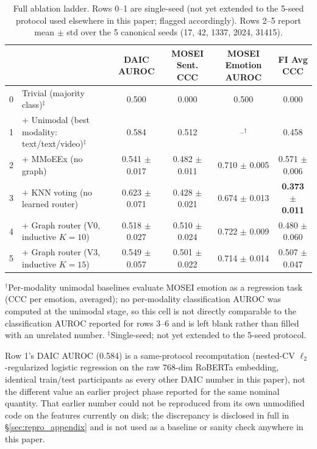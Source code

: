 \documentclass[letterpaper]{article}
\begin{document}
\begin{table}[t]
\centering
\caption{Full ablation ladder. Rows 0--1 are single-seed (not yet extended to the 5-seed protocol used elsewhere in this paper; flagged accordingly). Rows 2--5 report mean $\pm$ std over the 5 canonical seeds (17, 42, 1337, 2024, 31415).}
\label{tab:full_ablation}
\small
\begin{tabular}{llcccc}
\toprule
 & & DAIC AUROC & MOSEI Sent. CCC & MOSEI Emotion AUROC & FI Avg CCC \\
\midrule
0 & Trivial (majority class)$^\ddagger$ & 0.500 & 0.000 & 0.500 & 0.000 \\
1 & + Unimodal (best modality: text/text/video)$^\ddagger$ & 0.584 & 0.512 & --$^\dagger$ & 0.458 \\
2 & + MMoEEx (no graph) & 0.541 $\pm$ 0.017 & 0.482 $\pm$ 0.011 & 0.710 $\pm$ 0.005 & 0.571 $\pm$ 0.006 \\
3 & + KNN voting (no learned router) & 0.623 $\pm$ 0.071 & 0.428 $\pm$ 0.021 & 0.674 $\pm$ 0.013 & \textbf{0.373 $\pm$ 0.011} \\
4 & + Graph router (V0, inductive $K{=}10$) & 0.518 $\pm$ 0.027 & 0.510 $\pm$ 0.024 & 0.722 $\pm$ 0.009 & 0.480 $\pm$ 0.060 \\
5 & + Graph router (V3, inductive $K{=}15$) & 0.549 $\pm$ 0.057 & 0.501 $\pm$ 0.022 & 0.714 $\pm$ 0.014 & 0.507 $\pm$ 0.047 \\
\bottomrule
\end{tabular}

\vspace{2pt}
{\footnotesize $^\dagger$Per-modality unimodal baselines evaluate MOSEI emotion as a regression task (CCC per emotion, averaged); no per-modality classification AUROC was computed at the unimodal stage, so this cell is not directly comparable to the classification AUROC reported for rows 3--6 and is left blank rather than filled with an unrelated number. $^\ddagger$Single-seed; not yet extended to the 5-seed protocol.}
\end{table}

Row 1's DAIC AUROC (0.584) is a same-protocol recomputation (nested-CV $\ell_2$-regularized logistic regression on the raw 768-dim RoBERTa embedding, identical train/test participants as every other DAIC number in this paper), not the different value an earlier project phase reported for the same nominal quantity. That earlier number could not be reproduced from its own unmodified code on the features currently on disk; the discrepancy is disclosed in full in \S\ref{sec:repro_appendix} and is not used as a baseline or sanity check anywhere in this paper.
\end{document}
